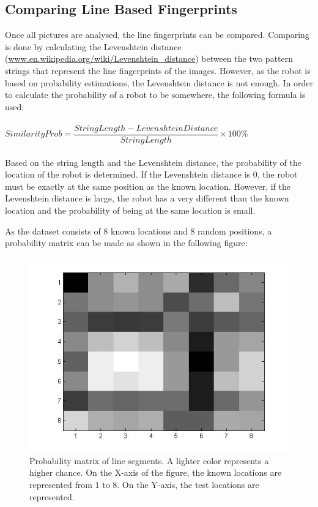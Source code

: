 \documentclass[12pt]{article}
\begin{document}
\subsection{Comparing Line Based Fingerprints}
Once all pictures are analysed, the line fingerprints can be compared. Comparing is done by calculating the Levenshtein distance\\ (\url{www.en.wikipedia.org/wiki/Levenshtein_distance}) between the two pattern strings that represent the line fingerprints of the images. However, as the robot is based on probability estimations, the Levenshtein distance is not enough. In order to calculate the probability of a robot to be somewhere, the following formula is used:\\\\
$SimilarityProb = \dfrac{StringLength - LevenshteinDistance}{StringLength} \times 100\%$\\\\
Based on the string length and the Levenshtein distance, the probability of the location of the robot is determined. If the Levenshtein distance is 0, the robot must be exactly at the same position as the known location. However, if the Levenshtein distance is large, the robot has a very different than the known location and the probability of being at the same location is small.

As the dataset consists of 8 known locations and 8 random positions, a probability matrix can be made as shown in the following figure:

\begin{figure}[H]
	\centering
	\includegraphics[width=\textwidth]{lines_chance.jpg}
	\caption{Probability matrix of line segments. A lighter color represents a higher chance. On the X-axis of the figure, the known locations are represented from 1 to 8. On the Y-axis, the test locations are represented.}
\end{figure}
\end{document}
